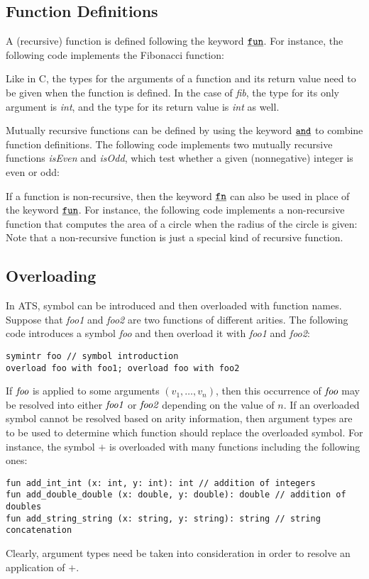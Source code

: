 \subsection{Function Definitions}

A (recursive) function is defined following the keyword $\underline{\texttt{fun}}$.
For instance, the following code implements the Fibonacci function:

Like in C, the types for the arguments of a function and its return value
need to be given when the function is defined. In the case of {\it fib},
the type for its only argument is {\it\blue int}, and the type for its
return value is {\it\blue int} as well.

Mutually recursive functions can be defined by using the keyword $\underline{\texttt{and}}$
to combine function definitions. The following code implements two mutually
recursive functions {\it isEven} and {\it isOdd}, which test whether a given
(nonnegative) integer is even or odd:


If a function is non-recursive, then the keyword $\underline{\texttt{fn}}$ can also be used
in place of the keyword $\underline{\texttt{fun}}$. For instance, the following code
implements a non-recursive function that computes the area of a circle when
the radius of the circle is given: 
Note that a non-recursive function is just a special kind of recursive
function.

\subsection{Overloading}
In ATS, symbol can be introduced and then overloaded with function names.
Suppose that {\it foo1} and {\it foo2} are two functions of different
arities. The following code introduces a symbol {\it foo} and then overload
it with {\it foo1} and {\it foo2}:
\begin{verbatim}
symintr foo // symbol introduction
overload foo with foo1; overload foo with foo2
\end{verbatim}
If $\mbox{\it foo}$ is applied to some arguments $(v_1,\ldots,v_n)$, then
this occurrence of $\mbox{\it foo}$ may be resolved into either $\mbox{\it
foo1}$ or $\mbox{\it foo2}$ depending on the value of $n$.  If an
overloaded symbol cannot be resolved based on arity information, then
argument types are to be used to determine which function should replace
the overloaded symbol.  For instance, the symbol $+$ is overloaded with
many functions including the following ones:
\begin{verbatim}
fun add_int_int (x: int, y: int): int // addition of integers
fun add_double_double (x: double, y: double): double // addition of doubles
fun add_string_string (x: string, y: string): string // string concatenation
\end{verbatim}
Clearly, argument types need be taken into consideration in order to
resolve an application of $+$.

